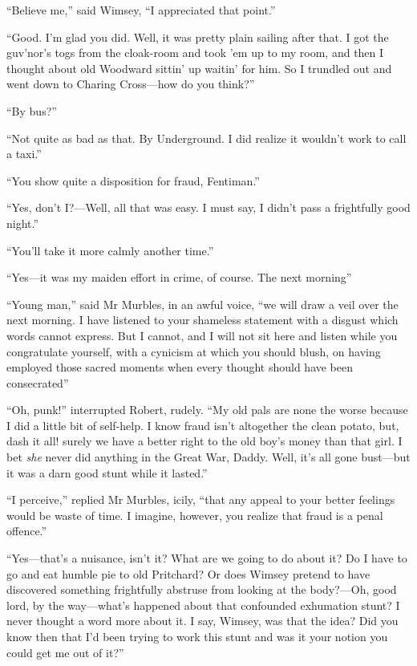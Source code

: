 \enquote{Believe me,} said Wimsey, \enquote{I appreciated that point.}

\enquote{Good. I'm glad you did. Well, it was pretty plain sailing after that. I got the guv'nor's togs from the cloak-room and took 'em up to my room, and then I thought about old Woodward sittin' up waitin' for him. So I trundled out and went down to Charing Cross\allowbreak---\allowbreak how do you think?}

\enquote{By bus?}

\enquote{Not quite as bad as that. By Underground. I did realize it wouldn't work to call a taxi.}

\enquote{You show quite a disposition for fraud, Fentiman.}

\enquote{Yes, don't I?---Well, all that was easy. I must say, I didn't pass a frightfully good night.}

\enquote{You'll take it more calmly another time.}

\enquote{Yes\allowbreak---\allowbreak it was my maiden effort in crime, of course. The next morning\longdash}

\enquote{Young man,} said Mr Murbles, in an awful voice, \enquote{we will draw a veil over the next morning. I have listened to your shameless statement with a disgust which words cannot express. But I cannot, and I will not sit here and listen while you congratulate yourself, with a cynicism at which you should blush, on having employed those sacred moments when every thought should have been consecrated\longdash}

\enquote{Oh, punk!} interrupted Robert, rudely. \enquote{My old pals are none the worse because I did a little bit of self-help. I know fraud isn't altogether the clean potato, but, dash it all! surely we have a better right to the old boy's money than that girl. I bet \textit{she} never did anything in the Great War, Daddy. Well, it's all gone bust\allowbreak---\allowbreak but it was a darn good stunt while it lasted.}

\enquote{I perceive,} replied Mr Murbles, icily, \enquote{that any appeal to your better feelings would be waste of time. I imagine, however, you realize that fraud is a penal offence.}

\enquote{Yes\allowbreak---\allowbreak that's a nuisance, isn't it? What are we going to do about it? Do I have to go and eat humble pie to old Pritchard? Or does Wimsey pretend to have discovered something frightfully abstruse from looking at the body?---Oh, good lord, by the way\allowbreak---\allowbreak what's happened about that confounded exhumation stunt? I never thought a word more about it. I say, Wimsey, was that the idea? Did you know then that I'd been trying to work this stunt and was it your notion you could get me out of it?}

